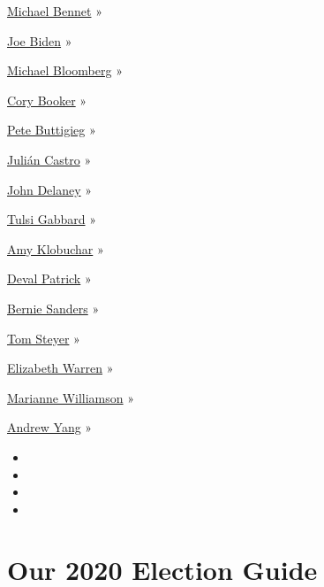 \href{https://www.nytimes3xbfgragh.onion/interactive/2020/us/elections/michael-bennet.html}{Michael
Bennet} »

\href{https://www.nytimes3xbfgragh.onion/interactive/2020/us/elections/joe-biden.html}{Joe
Biden} »

\href{https://www.nytimes3xbfgragh.onion/interactive/2020/us/elections/michael-bloomberg.html}{Michael
Bloomberg} »

\href{https://www.nytimes3xbfgragh.onion/interactive/2020/us/elections/cory-booker.html}{Cory
Booker} »

\href{https://www.nytimes3xbfgragh.onion/interactive/2020/us/elections/pete-buttigieg.html}{Pete
Buttigieg} »

\href{https://www.nytimes3xbfgragh.onion/interactive/2020/us/elections/julian-castro.html}{Julián
Castro} »

\href{https://www.nytimes3xbfgragh.onion/interactive/2020/us/elections/john-delaney.html}{John
Delaney} »

\href{https://www.nytimes3xbfgragh.onion/interactive/2020/us/elections/tulsi-gabbard.html}{Tulsi
Gabbard} »

\href{https://www.nytimes3xbfgragh.onion/interactive/2020/us/elections/amy-klobuchar.html}{Amy
Klobuchar} »

\href{https://www.nytimes3xbfgragh.onion/interactive/2020/us/elections/deval-patrick.html}{Deval
Patrick} »

\href{https://www.nytimes3xbfgragh.onion/interactive/2020/us/elections/bernie-sanders.html}{Bernie
Sanders} »

\href{https://www.nytimes3xbfgragh.onion/interactive/2020/us/elections/tom-steyer.html}{Tom
Steyer} »

\href{https://www.nytimes3xbfgragh.onion/interactive/2020/us/elections/elizabeth-warren.html}{Elizabeth
Warren} »

\href{https://www.nytimes3xbfgragh.onion/interactive/2020/us/elections/marianne-williamson.html}{Marianne
Williamson} »

\href{https://www.nytimes3xbfgragh.onion/interactive/2020/us/elections/andrew-yang.html}{Andrew
Yang} »

\begin{itemize}
\item
\item
\item
\item
\end{itemize}

\hypertarget{our-2020-election-guide}{%
\section{Our 2020 Election Guide}\label{our-2020-election-guide}}

